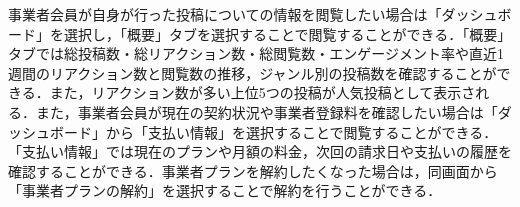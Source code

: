 事業者会員が自身が行った投稿についての情報を閲覧したい場合は「ダッシュボード」を選択し，「概要」タブを選択することで閲覧することができる．「概要」タブでは総投稿数・総リアクション数・総閲覧数・エンゲージメント率や直近1週間のリアクション数と閲覧数の推移，ジャンル別の投稿数を確認することができる．また，リアクション数が多い上位5つの投稿が人気投稿として表示される．また，事業者会員が現在の契約状況や事業者登録料を確認したい場合は「ダッシュボード」から「支払い情報」を選択することで閲覧することができる．「支払い情報」では現在のプランや月額の料金，次回の請求日や支払いの履歴を確認することができる．事業者プランを解約したくなった場合は，同画面から「事業者プランの解約」を選択することで解約を行うことができる．